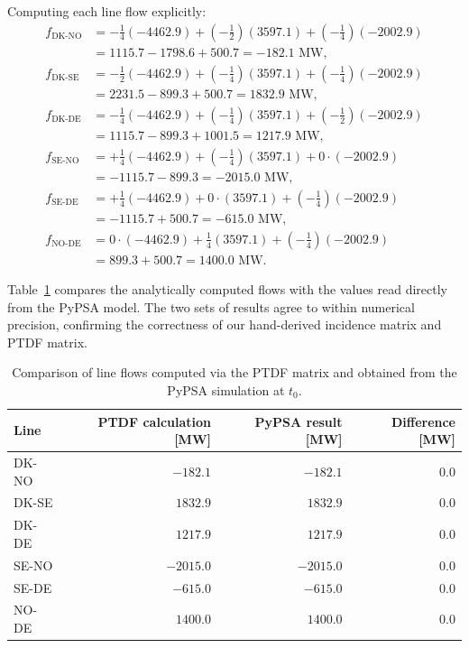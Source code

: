Computing each line flow explicitly:
\begin{align}
f_\text{DK-NO} &= -\tfrac{1}{4}(-4462.9) + \left(-\tfrac{1}{2}\right)(3597.1) + \left(-\tfrac{1}{4}\right)(-2002.9) \nonumber\\
               &= 1115.7 - 1798.6 + 500.7 = -182.1\text{ MW}, \\[4pt]
f_\text{DK-SE} &= -\tfrac{1}{2}(-4462.9) + \left(-\tfrac{1}{4}\right)(3597.1) + \left(-\tfrac{1}{4}\right)(-2002.9) \nonumber\\
               &= 2231.5 - 899.3 + 500.7 = 1832.9\text{ MW}, \\[4pt]
f_\text{DK-DE} &= -\tfrac{1}{4}(-4462.9) + \left(-\tfrac{1}{4}\right)(3597.1) + \left(-\tfrac{1}{2}\right)(-2002.9) \nonumber\\
               &= 1115.7 - 899.3 + 1001.5 = 1217.9\text{ MW}, \\[4pt]
f_\text{SE-NO} &= +\tfrac{1}{4}(-4462.9) + \left(-\tfrac{1}{4}\right)(3597.1) + 0\cdot(-2002.9) \nonumber\\
               &= -1115.7 - 899.3 = -2015.0\text{ MW}, \\[4pt]
f_\text{SE-DE} &= +\tfrac{1}{4}(-4462.9) + 0\cdot(3597.1) + \left(-\tfrac{1}{4}\right)(-2002.9) \nonumber\\
               &= -1115.7 + 500.7 = -615.0\text{ MW}, \\[4pt]
f_\text{NO-DE} &= 0\cdot(-4462.9) + \tfrac{1}{4}(3597.1) + \left(-\tfrac{1}{4}\right)(-2002.9) \nonumber\\
               &= 899.3 + 500.7 = 1400.0\text{ MW}.
\end{align}

Table~\ref{tab:ptdf_verify} compares the analytically computed flows with the values read directly from the PyPSA model. The two sets of results agree to within numerical precision, confirming the correctness of our hand-derived incidence matrix and PTDF matrix.

\begin{table}[h]
\centering
\caption{Comparison of line flows computed via the PTDF matrix and obtained from the PyPSA simulation at $t_0$.}
\label{tab:ptdf_verify}
\begin{tabular}{lrrr}
\toprule
Line & PTDF calculation [MW] & PyPSA result [MW] & Difference [MW] \\
\midrule
DK-NO & $-182.1$ & $-182.1$ & $0.0$ \\
DK-SE & $1832.9$ & $1832.9$ & $0.0$ \\
DK-DE & $1217.9$ & $1217.9$ & $0.0$ \\
SE-NO & $-2015.0$ & $-2015.0$ & $0.0$ \\
SE-DE & $-615.0$ & $-615.0$ & $0.0$ \\
NO-DE & $1400.0$ & $1400.0$ & $0.0$ \\
\bottomrule
\end{tabular}
\end{table}

